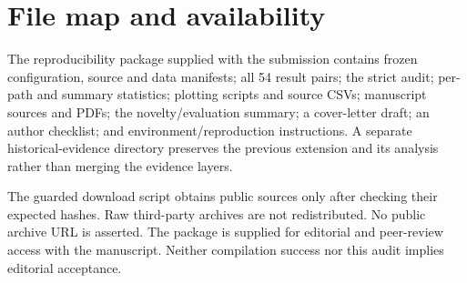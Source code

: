 \documentclass[smallextended]{svjour3}
\begin{document}
\section{File map and availability}
The reproducibility package supplied with the submission contains frozen configuration, source and data manifests;
all 54 result pairs; the strict audit; per-path and summary statistics; plotting
scripts and source CSVs; manuscript sources and PDFs; the novelty/evaluation
summary; a cover-letter draft; an author checklist; and environment/reproduction
instructions. A separate historical-evidence directory preserves the previous
extension and its analysis rather than merging the evidence layers.

The guarded download script obtains public sources only after checking their
expected hashes. Raw third-party archives are not redistributed. No public
archive URL is asserted. The package is supplied for editorial and peer-review
access with the manuscript. Neither compilation success nor this audit implies
editorial acceptance.
\end{document}
